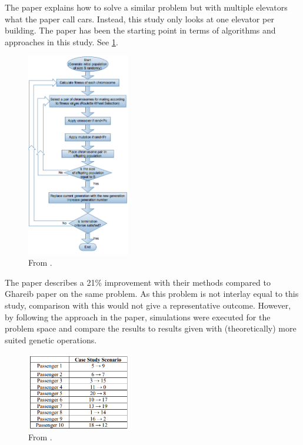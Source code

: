 
The paper\cite{tartan2016genetic} explains how to solve a similar problem but with multiple elevators what the paper call cars. Instead, this study only looks at one elevator per building. The paper has been the starting point in terms of algorithms and approaches in this study. See \ref{fig:Flow_1}.

\begin{figure}[ht]
	\centering
	\includegraphics[width=0.4\textwidth]{figures/flowchart.png}
	\caption{From \cite{tartan2016flow}.}
	\label{fig:Flow_1}
\end{figure}
The paper describes a 21\% improvement with their methods compared to Ghareib paper \cite{gharieb2005optimal} on the same problem. As this problem is not interlay equal to this study, comparison with this would not give a representative outcome. However, by following the approach in the paper, simulations were executed for the problem space and compare the results to results given with (theoretically) more suited genetic operations.

\newpage

\begin{figure}[ht]
	\centering
	\includegraphics[width=0.4\textwidth]{figures/tabel_1.png}
	\caption{From \cite{ahmed2022investigation}.}
	\label{fig:table 1}
\end{figure}

